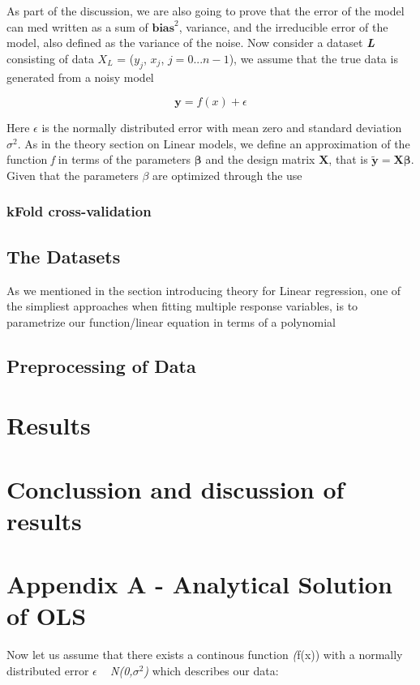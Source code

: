 \documentclass[a4paper, 10pt]{article}
\begin{document}
As part of the discussion, we are also going to prove that the error of the model can med written as a sum of $\boldsymbol{bias}^2$, variance, and the irreducible error of the model, also defined as the variance of the noise. Now consider a dataset \textbf{\emph{L}} consisting of data \textbf{\emph{$X_L$}} = {(\emph{$y_j$}, \textbf{$x_j$}, $j=0 ... n-1$)}, we assume that the true data is generated from a noisy model 

$$
\boldsymbol{y} = f(x) + \epsilon
$$

Here $\epsilon$ is the normally distributed error with mean zero and standard deviation $\sigma^2$. As in the theory section on Linear models, we define an approximation of the function \emph{f} in terms of the parameters $\boldsymbol{\beta}$ and the design matrix $\boldsymbol{X}$, that is $\boldsymbol{\tilde{y}} = \boldsymbol{X}\boldsymbol{\beta}$. Given that the parameters $\beta$ are optimized through the use 
\subsubsection{kFold cross-validation}

\subsection{The Datasets}
As we mentioned in the section introducing theory for Linear regression, one of the simpliest approaches when fitting multiple response variables, is to parametrize our function/linear equation in terms of a polynomial 

\subsection{Preprocessing of Data}

\section{Results}

\section{Conclussion and discussion of results}


\section{Appendix A - Analytical Solution of OLS}
Now let us assume that there exists a continous function \emph(f(x)) with a normally distributed error $\epsilon$ ~ \emph{N(0,$\sigma^2$)} which describes our data: 
\end{document}
